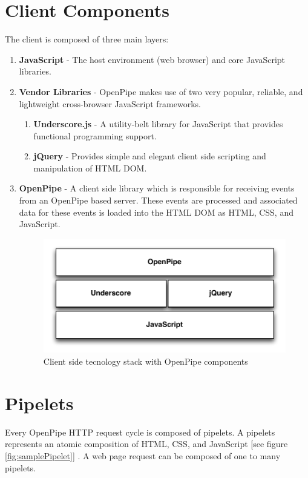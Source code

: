 \documentclass[12pt]{report}
\begin{document}
\section{Client Components}
The client is composed of three main layers:

\begin{enumerate}
	\item \textbf{JavaScript} - The host environment (web browser) and core JavaScript libraries.
	\item \textbf{Vendor Libraries} - OpenPipe makes use of two very popular, reliable, and lightweight cross-browser JavaScript frameworks.
		\begin{enumerate} 
			\item \textbf{Underscore.js} - A utility-belt library for JavaScript that provides functional programming support.
			\item \textbf{jQuery} - Provides simple and elegant client side scripting and manipulation of HTML DOM.
		\end{enumerate}
	\item \textbf{OpenPipe} - A client side library which is responsible for receiving events from an OpenPipe based server. These events are processed and associated data for these events is loaded into the HTML DOM as HTML, CSS, and JavaScript.
		
		\begin{figure}[H]
		\centering
		\includegraphics[width=\textwidth,keepaspectratio]{figures/images/client_stack.pdf}
		\caption{Client side tecnology stack with OpenPipe components}
		\label{fig:clientFrameworkStack}
		\end{figure}

\end{enumerate}


\section{Pipelets}
Every OpenPipe HTTP request cycle is composed of pipelets. A pipelets represents an atomic composition of HTML, CSS, and JavaScript [see figure \ref{fig:samplePipelet}] . A web page request can be composed of one to many pipelets.
\end{document}
